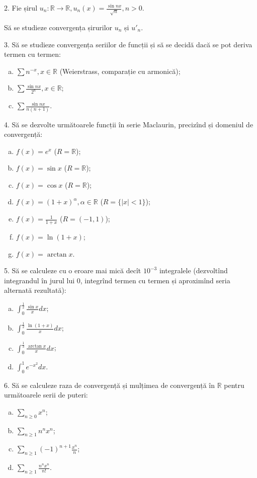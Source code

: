 \documentclass[11pt,a4paper]{article}
\newcommand\ds{\displaystyle}
\newcommand\RR{\mathbb{R}}
\theoremstyle{dotless}
\theoremstyle{dotlessdr}
\begin{document}
\vspace{1cm}

2. Fie șirul $u_n : \RR \to \RR, u_n(x) = \frac{\sin nx}{\sqrt{n}}, n > 0$.

Să se studieze convergența șirurilor $u_n$ și $u'_n$.

\vspace{1cm}

3. Să se studieze convergența seriilor de funcții și să se decidă dacă
se pot deriva termen cu termen:
\begin{enumerate}[(a)]
\item $\sum n^{-x}, x \in \RR$ (Weierstrass, comparație cu armonică);
\item $\sum \frac{\sin nx}{2^n}, x \in \RR$;
\item $\sum \frac{\sin nx}{n(n+1)}$.
\end{enumerate}

\vspace{1cm}

4. Să se dezvolte următoarele funcții în serie Maclaurin, precizînd și domeniul de convergență:
\begin{enumerate}[(a)]
\item $f(x) = e^x$ ($R = \RR$);
\item $f(x) = \sin x$ ($R = \RR$);
\item $f(x) = \cos x$ ($R = \RR$);
\item $f(x) = (1 + x)^\alpha, \alpha \in \RR$ ($R = \{ |x| < 1 \}$);
\item $f(x) = \frac{1}{1 + x}$ ($R = (-1, 1)$);
\item $f(x) = \ln(1 + x)$;
\item $f(x) = \arctan x$.
\end{enumerate}

\vspace{1cm}

5. Să se calculeze cu o eroare mai mică decît $10^{-3}$ integralele (dezvoltînd
integrandul în jurul lui 0, integrînd termen cu termen și aproximînd seria alternată
rezultată):
\begin{enumerate}[(a)]
\item $\ds\int_0^{\frac{1}{2}} \frac{\sin x}{x} dx$;
\item $\ds\int_0^{\frac{1}{2}} \frac{\ln(1 + x)}{x} dx$;
\item $\ds\int_0^{\frac{1}{3}} \frac{\arctan x}{x} dx$;
\item $\ds\int_0^1 e^{-x^2} dx$.
\end{enumerate}

\vspace{1cm}

6. Să se calculeze raza de convergență și mulțimea de convergență în $\RR$ pentru
următoarele serii de puteri:
\begin{enumerate}[(a)]
\item $\ds\sum_{n \geq 0} x^n$;
\item $\ds\sum_{n \geq 1} n^n x^n$;
\item $\ds\sum_{n \geq 1} (-1)^{n + 1} \frac{x^n}{n}$;
\item $\ds\sum_{n \geq 1} \frac{n^n x^n}{n!}$.
\end{enumerate}
\end{document}
